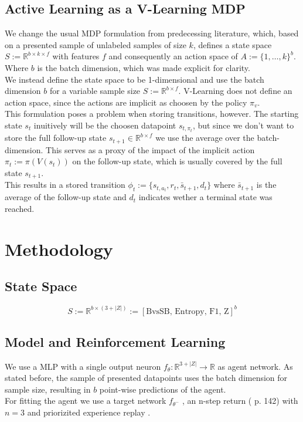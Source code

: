 \documentclass[]{article}
\begin{document}
\subsection{Active Learning as a V-Learning MDP}
We change the usual MDP formulation from predecessing literature, which, based on a presented sample of unlabeled samples of size $k$, defines a state space $S := \mathbb{R}^{b \times k \times f}$ with features $f$ and consequently an action space of $A := \{ 1, \ldots, k \}^b$. Where $b$ is the batch dimension, which was made explicit for clarity. \\ [1mm]
We instead define the state space to be 1-dimensional and use the batch dimension $b$ for a variable sample size $S := \mathbb{R}^{b \times f}$.
V-Learning does not define an action space, since the actions are implicit as choosen by the policy $\pi_v$. \\
This formulation poses a problem when storing transitions, however. The starting state $s_t$ inuitively will be the choosen datapoint $s_{t, \pi_t}$, but since we don't want to store the full follow-up state $s_{t+1} \in \mathbb{R}^{b \times f}$ we use the average over the batch-dimension.
This serves as a proxy of the impact of the implicit action $\pi_t := \pi(V(s_t))$ on the follow-up state, which is usually covered by the full state $s_{t+1}$.\\
This results in a stored transition $\phi_t := \{ s_{t, a_t}, r_t, \bar{s}_{t+1}, d_t \}$ where $\bar{s}_{t+1}$ is the average of the follow-up state and $d_t$ indicates wether a terminal state was reached.

\section{Methodology}

\subsection{State Space}
\begin{equation}
S := \mathbb{R}^{b \times (3+|Z|)} := [\text{BvsSB, Entropy, F1, Z}]^b
\end{equation}

\subsection{Model and Reinforcement Learning}
We use a MLP with a single output neuron $f_\theta : \mathbb{R}^{3+|Z|} \rightarrow \mathbb{R}$ as agent network.
As stated before, the sample of presented datapoints uses the batch dimension for sample size, resulting in $b$ point-wise predictions of the agent. \\
For fitting the agent we use a target network $f_{\theta^-}$ \cite{double_q_learning}, an n-step return (\cite{rl_intro} p. 142) with $n=3$ and priorizited experience replay \cite{prioritized_replay}.
\end{document}
